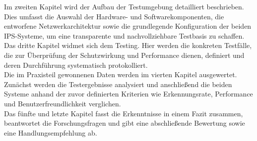 Im zweiten Kapitel wird der Aufbau der Testumgebung detailliert beschrieben. Dies umfasst die Auswahl der Hardware- und Softwarekomponenten, die entworfene Netzwerkarchitektur sowie die grundlegende Konfiguration der beiden IPS-Systeme, um eine transparente und nachvollziehbare Testbasis zu schaffen.\\

Das dritte Kapitel widmet sich dem Testing. Hier werden die konkreten Testfälle, die zur Überprüfung der Schutzwirkung und Performance dienen, definiert und deren Durchführung systematisch protokolliert.\\

Die im Praxisteil gewonnenen Daten werden im vierten Kapitel ausgewertet. Zunächst werden die Testergebnisse analysiert und anschließend die beiden Systeme anhand der zuvor definierten Kriterien wie Erkennungsrate, Performance und Benutzerfreundlichkeit verglichen. \\

Das fünfte und letzte Kapitel fasst die Erkenntnisse in einem Fazit zusammen, beantwortet die Forschungsfragen und gibt eine abschließende Bewertung sowie eine Handlungsempfehlung ab. 